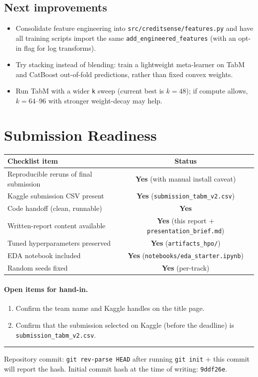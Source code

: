 \documentclass[11pt,a4paper]{article}
\begin{document}
\subsection{Next improvements}

\begin{itemize}[leftmargin=*,nosep]
  \item Consolidate feature engineering into \texttt{src/creditsense/features.py} and have all training scripts import the same \texttt{add\_engineered\_features} (with an opt-in flag for log transforms).
  \item Try stacking instead of blending: train a lightweight meta-learner on TabM and CatBoost out-of-fold predictions, rather than fixed convex weights.
  \item Run TabM with a wider \texttt{k} sweep (current best is $k{=}48$); if compute allows, $k{=}64$--$96$ with stronger weight-decay may help.
\end{itemize}

\section{Submission Readiness}

\begin{table}[h]
\centering
\small
\begin{tabular}{lc}
\toprule
\textbf{Checklist item} & \textbf{Status} \\
\midrule
Reproducible reruns of final submission & \textbf{Yes} (with manual install caveat) \\
Kaggle submission CSV present & \textbf{Yes} (\texttt{submission\_tabm\_v2.csv}) \\
Code handoff (clean, runnable) & \textbf{Yes} \\
Written-report content available & \textbf{Yes} (this report + \texttt{presentation\_brief.md}) \\
Tuned hyperparameters preserved & \textbf{Yes} (\texttt{artifacts\_hpo/}) \\
EDA notebook included & \textbf{Yes} (\texttt{notebooks/eda\_starter.ipynb}) \\
Random seeds fixed & \textbf{Yes} (per-track) \\
\bottomrule
\end{tabular}
\end{table}

\paragraph{Open items for hand-in.}
\begin{enumerate}[leftmargin=*,nosep]
  \item Confirm the team name and Kaggle handles on the title page.
  \item Confirm that the submission selected on Kaggle (before the deadline) is \texttt{submission\_tabm\_v2.csv}.
\end{enumerate}

\vspace{1em}
\noindent\rule{\linewidth}{0.4pt}
\small Repository commit: \texttt{git rev-parse HEAD} after running \texttt{git init} $+$ this commit will report the hash. Initial commit hash at the time of writing: \texttt{9ddf26e}.
\end{document}
